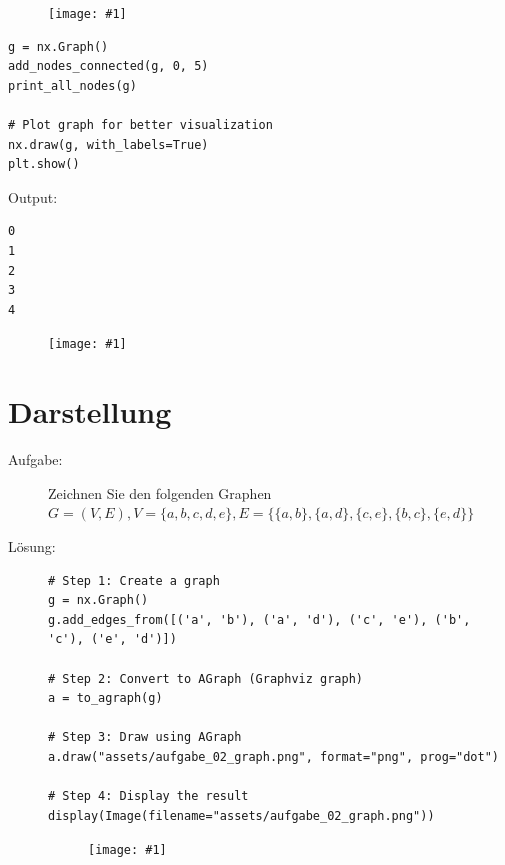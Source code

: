 \documentclass[a4paper,11pt]{report}
\newcommand{\screenshot}[1]{
    \begin{figure}[H]
        \centering
        \texttt{[image: \#1]}
    \end{figure}
}
\begin{document}
\begin{description}
        \screenshot{notebook/assets/aufgabe_01_nodes.png}

        \begin{verbatim}
g = nx.Graph()
add_nodes_connected(g, 0, 5)
print_all_nodes(g)

# Plot graph for better visualization
nx.draw(g, with_labels=True)
plt.show()
        \end{verbatim}
        Output: 
        \begin{verbatim}
0
1
2
3
4
        \end{verbatim}
        \screenshot{notebook/assets/aufgabe_01_connected.png}
    \end{description}
\newpage

\chapter{Darstellung}
\begin{description}
    \item[Aufgabe:] Zeichnen Sie den folgenden Graphen \newline
        \begin{math}
            G = (V, E), V = \{a, b, c, d, e\}, E = \{\{a, b\}, \{a, d\}, \{c, e\}, \{b, c\}, \{e, d\}\}
        \end{math}
    \item[Lösung:] \hfill \newline %
        \begin{verbatim}
# Step 1: Create a graph
g = nx.Graph()
g.add_edges_from([('a', 'b'), ('a', 'd'), ('c', 'e'), ('b', 'c'), ('e', 'd')])

# Step 2: Convert to AGraph (Graphviz graph)
a = to_agraph(g)

# Step 3: Draw using AGraph
a.draw("assets/aufgabe_02_graph.png", format="png", prog="dot")

# Step 4: Display the result
display(Image(filename="assets/aufgabe_02_graph.png"))
        \end{verbatim}
        \screenshot{notebook/assets/aufgabe_02_graph.png}
\end{description}
\newpage
\end{document}
